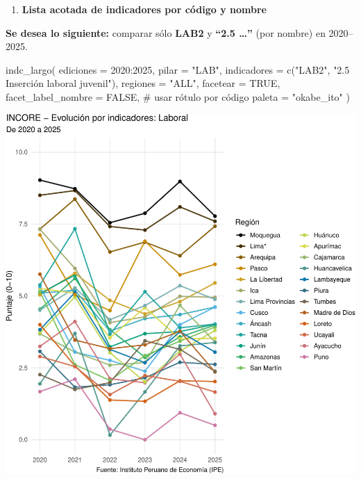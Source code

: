 \documentclass[
  11pt,
  letterpaper,
  DIV=11,
  numbers=noendperiod]{scrartcl}
\newenvironment{Shaded}{\begin{snugshade}}{\end{snugshade}}
\newcommand{\AttributeTok}[1]{\textcolor[rgb]{0.40,0.45,0.13}{#1}}
\newcommand{\CommentTok}[1]{\textcolor[rgb]{0.37,0.37,0.37}{#1}}
\newcommand{\ConstantTok}[1]{\textcolor[rgb]{0.56,0.35,0.01}{#1}}
\newcommand{\DecValTok}[1]{\textcolor[rgb]{0.68,0.00,0.00}{#1}}
\newcommand{\FunctionTok}[1]{\textcolor[rgb]{0.28,0.35,0.67}{#1}}
\newcommand{\NormalTok}[1]{\textcolor[rgb]{0.00,0.23,0.31}{#1}}
\newcommand{\SpecialCharTok}[1]{\textcolor[rgb]{0.37,0.37,0.37}{#1}}
\newcommand{\StringTok}[1]{\textcolor[rgb]{0.13,0.47,0.30}{#1}}
\providecommand{\tightlist}{%
  \setlength{\itemsep}{0pt}\setlength{\parskip}{0pt}}\usepackage{longtable,booktabs,array}
\begin{document}
\begin{enumerate}
\def\labelenumi{\arabic{enumi}.}
\setcounter{enumi}{1}
\tightlist
\item
  \textbf{Lista acotada de indicadores por código y nombre}
\end{enumerate}

\textbf{Se desea lo siguiente:} comparar sólo \textbf{LAB2} y
\textbf{``2.5 \ldots{}''} (por nombre) en 2020--2025.

\begin{Shaded}
\begin{Highlighting}[]
\FunctionTok{indc\_largo}\NormalTok{(}
  \AttributeTok{ediciones          =} \DecValTok{2020}\SpecialCharTok{:}\DecValTok{2025}\NormalTok{,}
  \AttributeTok{pilar              =} \StringTok{"LAB"}\NormalTok{,}
  \AttributeTok{indicadores        =} \FunctionTok{c}\NormalTok{(}\StringTok{"LAB2"}\NormalTok{, }\StringTok{"2.5 Inserción laboral juvenil"}\NormalTok{),}
  \AttributeTok{regiones           =} \StringTok{"ALL"}\NormalTok{,}
  \AttributeTok{facetear           =} \ConstantTok{TRUE}\NormalTok{,}
  \AttributeTok{facet\_label\_nombre =} \ConstantTok{FALSE}\NormalTok{,  }\CommentTok{\# usar rótulo por código}
  \AttributeTok{paleta             =} \StringTok{"okabe\_ito"}
\NormalTok{)}
\end{Highlighting}
\end{Shaded}

\includegraphics{Manual_files/figure-pdf/unnamed-chunk-82-1.pdf}
\end{document}
